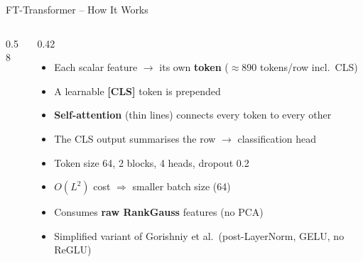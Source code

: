 \documentclass[9pt,aspectratio=169]{beamer}
\begin{document}
\begin{frame}{FT-Transformer -- How It Works}
\begin{columns}[T]
\begin{column}{0.58\textwidth}
    \end{column}
    \begin{column}{0.42\textwidth}
      \begin{itemize}
        \item Each scalar feature $\to$ its own \textbf{token} ($\approx$890 tokens/row incl.\ CLS)
        \item A learnable \textbf{[CLS]} token is prepended
        \item \textbf{Self-attention} (thin lines) connects every token to every other
        \item The CLS output summarises the row $\to$ classification head
        \item Token size 64, 2 blocks, 4 heads, dropout 0.2
        \item $O(L^2)$ cost $\Rightarrow$ smaller batch size (64)
        \item Consumes \textbf{raw RankGauss} features (no PCA)
        \item Simplified variant of Gorishniy et al.\ (post-LayerNorm, GELU, no ReGLU)
      \end{itemize}
    \end{column}
  \end{columns}
\end{frame}
\end{document}
